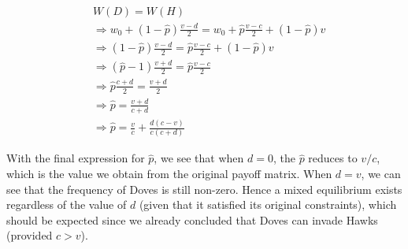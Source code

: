 \documentclass{article}
\begin{document}
\begin{align*}
    &W(D) = W(H) \\
    &\Rightarrow w_0 + (1 - \hat{p}) \frac{v - d}{2} = w_0 + \hat{p} \frac{v - c}{2} + (1 - \hat{p}) v \\
    &\Rightarrow (1 - \hat{p}) \frac{v - d}{2} = \hat{p} \frac{v - c}{2} + (1 - \hat{p}) v \\
    &\Rightarrow (\hat{p} - 1) \frac{v + d}{2} = \hat{p} \frac{v - c}{2} \\
    &\Rightarrow \hat{p} \frac{c + d}{2} = \frac{v + d}{2} \\
    &\Rightarrow \hat{p} = \frac{v + d}{c + d} \\
    &\Rightarrow \hat{p} = \frac{v}{c} + \frac{d (c - v)}{c (c + d)}
\end{align*}

With the final expression for $\hat{p}$, we see that when $d = 0$, the
$\hat{p}$ reduces to $v/c$, which is the value we obtain from the
original payoff matrix. When $d = v$, we can see that the frequency of
Doves is still non-zero. Hence a mixed equilibrium exists regardless of
the value of $d$ (given that it satisfied its original constraints),
which should be expected since we already concluded that Doves can
invade Hawks (provided $c > v$).
\end{document}
